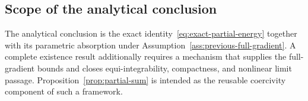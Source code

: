 \subsection{Scope of the analytical conclusion}

The analytical conclusion is the exact identity~\eqref{eq:exact-partial-energy} together with its parametric absorption under Assumption~\ref{ass:previous-full-gradient}. A complete existence result additionally requires a mechanism that supplies the full-gradient bounds and closes equi-integrability, compactness, and nonlinear limit passage. Proposition~\ref{prop:partial-sum} is intended as the reusable coercivity component of such a framework.